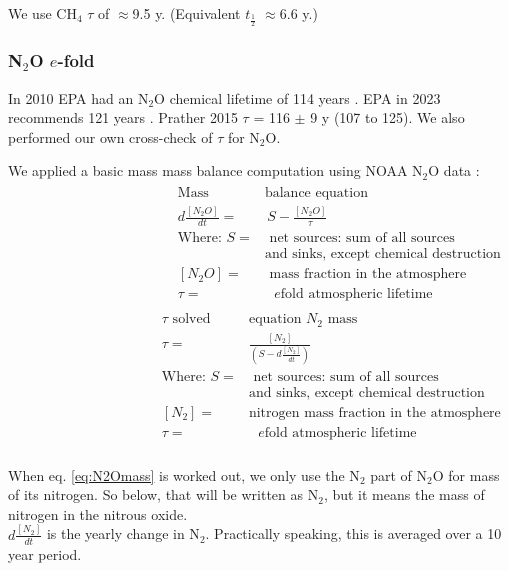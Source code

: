 \documentclass{article}
\begin{document}
We use CH$_4$ $\tau$ of $\approx$9.5 y. (Equivalent $t_{\frac{1}{2}}$ $\approx$6.6 y.) 

\subsubsection{N$_2$O $e$-fold}
\label{N2O_efold}
In 2010 EPA had an N$_2$O chemical lifetime of 114 years \cite{EPA2010CH4_N2O}. EPA in 2023 recommends 121 years \cite{EPA2023CH4_N2O}. Prather 2015 $\tau$ = 116 $\pm$ 9 y (107 to 125)\cite{Prather2015MeasureModelN2O}. We also performed our own cross-check of $\tau$ for N$_2$O. 

We applied a basic mass mass balance computation using NOAA N$_2$O data \cite{NOAA2022AGGIClimateTable}: 
\begin{align}
\label{eq:N2Omass} 
\begin{split} 
 \text{Mass } & \text{balance equation} \\
 d\frac{[N_2O]}{dt} =& \, S - \frac{[N_2O]}{\tau} \\
\text{Where: } S =& \text{ net sources: sum of all sources}\\ 
&\text{and sinks, except chemical destruction} \\
 [N_2O] =& \text{ mass fraction in the atmosphere} \\
 \tau =& \text{ $e$fold atmospheric lifetime} \\
\end{split}
\begin{split} 
 \tau\text{ solved } & \text{equation }N_2 \text{ mass} \\
 \tau =& \frac{[N_2]}{(S-d\frac{[N_2]}{dt})} \\
\text{Where: } S =& \text{ net sources: sum of all sources}\\ 
&\text{and sinks, except chemical destruction} \\
 [N_2] =& \text{nitrogen mass fraction in the atmosphere} \\
 \tau =& \text{ $e$fold atmospheric lifetime} \\
\end{split}
\end{align}

 When eq. \ref{eq:N2Omass} is worked out, we only use the N$_2$ part of N$_2$O for mass of its nitrogen. So below, that will be written as N$_2$, but it means the mass of nitrogen in the nitrous oxide. \\
 $d\frac{[N_2]}{dt}$ is the yearly change in N$_2$. Practically speaking, this is averaged over a 10 year period. 
 
\end{document}
